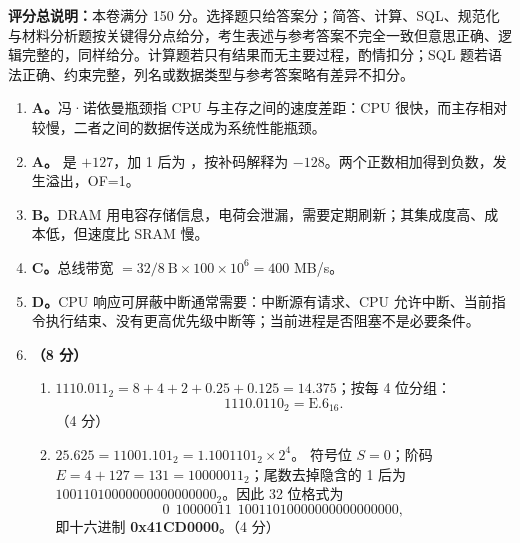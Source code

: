 \documentclass[a4paper,11pt]{article}
\begin{document}

\noindent\textbf{评分总说明：}本卷满分 150 分。选择题只给答案分；简答、计算、SQL、规范化与材料分析题按关键得分点给分，考生表述与参考答案不完全一致但意思正确、逻辑完整的，同样给分。计算题若只有结果而无主要过程，酌情扣分；SQL 题若语法正确、约束完整，列名或数据类型与参考答案略有差异不扣分。


\begin{enumerate}[start=1, label=\textbf{\arabic*.}, leftmargin=2.4em, itemsep=0.45em]

\item \textbf{A。}冯·诺依曼瓶颈指 CPU 与主存之间的速度差距：CPU 很快，而主存相对较慢，二者之间的数据传送成为系统性能瓶颈。

\item \textbf{A。} 是 $+127$，加 1 后为 ，按补码解释为 $-128$。两个正数相加得到负数，发生溢出，OF=1。

\item \textbf{B。}DRAM 用电容存储信息，电荷会泄漏，需要定期刷新；其集成度高、成本低，但速度比 SRAM 慢。

\item \textbf{C。}总线带宽 $=32/8\ \text{B}\times100\times10^{6}=400$ MB/s。

\item \textbf{D。}CPU 响应可屏蔽中断通常需要：中断源有请求、CPU 允许中断、当前指令执行结束、没有更高优先级中断等；当前进程是否阻塞不是必要条件。

\item \textbf{（8 分）}
\begin{enumerate}[label=（\arabic*）, leftmargin=2.2em, itemsep=1pt]
  \item $1110.011_2=8+4+2+0.25+0.125=14.375$；按每 4 位分组：
  \[
  1110.0110_2=\text{E.6}_{16}.
  \]
  \hfill（4 分）

  \item $25.625=11001.101_2=1.1001101_2\times2^{4}$。
  符号位 $S=0$；阶码 $E=4+127=131=10000011_2$；尾数去掉隐含的 1 后为
  $10011010000000000000000_2$。因此 32 位格式为
  \[
  0\ \ 10000011\ \ 10011010000000000000000,
  \]
  即十六进制 \textbf{0x41CD0000}。\hfill（4 分）
\end{enumerate}


\end{enumerate}
\end{document}
